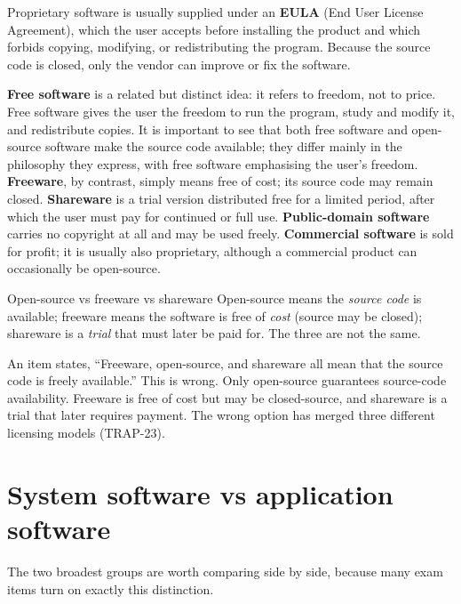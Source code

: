 Proprietary software is usually supplied under an \textbf{EULA} (End User
License Agreement), which the user accepts before installing the product and
which forbids copying, modifying, or redistributing the program. Because the
source code is closed, only the vendor can improve or fix the software.

\textbf{Free software} is a related but distinct idea: it refers to freedom,
not to price. Free software gives the user the freedom to run the program,
study and modify it, and redistribute copies. It is important to see that both
free software and open-source software make the source code available; they
differ mainly in the philosophy they express, with free software emphasising
the user's freedom. \textbf{Freeware}, by contrast,
simply means free of cost; its source code may remain closed.
\textbf{Shareware} is a trial version distributed free for a limited period,
after which the user must pay for continued or full use. \textbf{Public-domain
software} carries no copyright at all and may be used freely.
\textbf{Commercial software} is sold for profit; it is usually also
proprietary, although a commercial product can occasionally be open-source.

\begin{definitionbox}{Open-source vs freeware vs shareware}
Open-source means the \emph{source code} is available; freeware means the
software is free of \emph{cost} (source may be closed); shareware is a
\emph{trial} that must later be paid for. The three are not the same.
\end{definitionbox}

\begin{example}
An item states, ``Freeware, open-source, and shareware all mean that the
source code is freely available.'' This is wrong. Only open-source guarantees
source-code availability. Freeware is free of cost but may be closed-source,
and shareware is a trial that later requires payment. The wrong option has
merged three different licensing models (TRAP-23).
\end{example}

\section{System software vs application software}
The two broadest groups are worth comparing side by side, because many exam
items turn on exactly this distinction.

